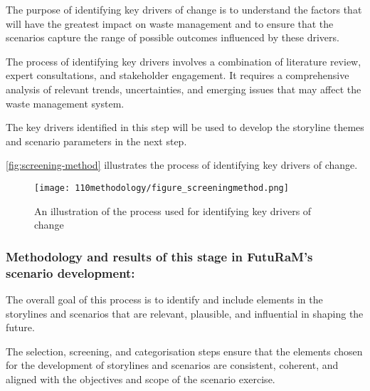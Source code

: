The purpose of identifying key drivers of change is to understand the factors that will have the greatest impact on waste management and to ensure that the scenarios capture the range of possible outcomes influenced by these drivers.

The process of identifying key drivers involves a combination of literature review, expert consultations, and stakeholder engagement. It requires a comprehensive analysis of relevant trends, uncertainties, and emerging issues that may affect the waste management system.

The key drivers identified in this step will be used to develop the storyline themes and scenario parameters in the next step.

\autoref{fig:screening-method} illustrates the process of identifying key drivers of change.

\begin{figure}[h!]
  \centering
  \texttt{[image: 110methodology/figure\_screeningmethod.png]}
  \caption{An illustration of the process used for identifying key drivers of change}\label{fig:screening-method}
\end{figure}
\clearpage



\subsubsection{Methodology and results of this stage in FutuRaM's scenario development:}

The overall goal of this process is to identify and include elements in the storylines and scenarios that are relevant, plausible, and influential in shaping the future.

The selection, screening, and categorisation steps ensure that the elements chosen for the development of storylines and scenarios are consistent, coherent, and aligned with the objectives and scope of the scenario exercise.


